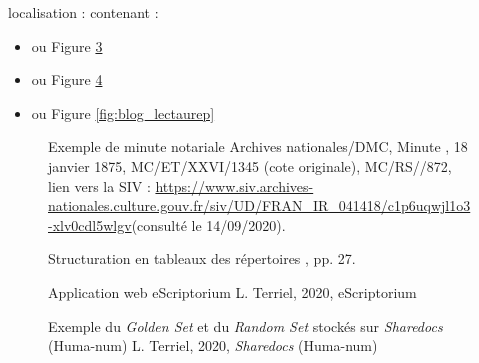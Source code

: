 localisation :  contenant :
\begin{itemize}
    \item {} ou Figure \ref{fig:appli_eScriptorium}
    \item {} ou Figure \ref{fig:shareDocs}
    \item {} ou Figure \ref{fig:blog_lectaurep}
\end{itemize}

\newpage


\begin{figure}[h!]
    \centering
    \centerline{}
    \caption{Exemple de minute notariale \textcopyright Archives nationales/DMC, Minute , 18 janvier 1875,  MC/ET/XXVI/1345 (cote originale), MC/RS//872, lien vers la SIV : \url{https://www.siv.archives-nationales.culture.gouv.fr/siv/UD/FRAN_IR_041418/c1p6uqwjl1o3-xlv0cdl5wlgv}(consulté le 14/09/2020).}
    \label{fig:exemple_minute}
\end{figure}

\begin{figure}[h!]
    \centering
    \centerline{}
    \caption{Structuration en tableaux des répertoires \textcopyright \cite{bonhomme_defis_2018}, pp. 27.} 
    \label{fig:tableaux_repertoires}
\end{figure}

\begin{figure}[h]
    \centering
    \centerline{}
    \caption{Application web eScriptorium \textcopyright L. Terriel, 2020, eScriptorium} 
    \label{fig:appli_eScriptorium}
\end{figure}

\begin{figure}[h]
    \centering
    \centerline{}
    \caption{Exemple du \textit{Golden Set} et du \textit{Random Set} stockés sur \textit{Sharedocs} (Huma-num) \textcopyright L. Terriel, 2020, \textit{Sharedocs} (Huma-num)} 
    \label{fig:shareDocs}
\end{figure}

